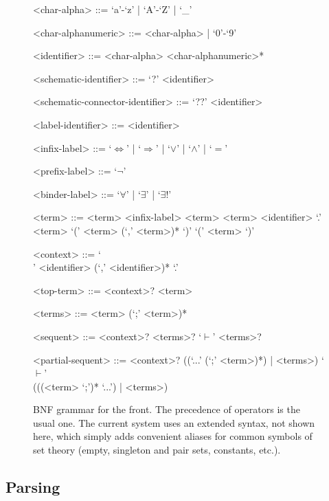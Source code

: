 \begin{figure}[H]
  \centering
  \begin{framed}
  \begin{grammar}
  <char-alpha> ::= `a'-`z' | `A'-`Z' | `_'
  
  <char-alphanumeric> ::= <char-alpha> | `0'-`9'
  
  <identifier> ::= <char-alpha> <char-alphanumeric>*
  
  <schematic-identifier> ::= `?' <identifier>
  
  <schematic-connector-identifier> ::= `??' <identifier>
  
  <label-identifier> ::= <identifier>
  
  <infix-label> ::= `\(\Leftrightarrow\)' | `\(\Rightarrow\)' | `\(\lor\)' | `\(\land\)' | `\(=\)'
  
  <prefix-label> ::= `\(\neg\)'
  
  <binder-label> ::= `\(\forall\)' | `\(\exists\)' | `\(\exists!\)'
  
  <term> ::= <term> <infix-label> <term>
   <term>
   <identifier> `.' <term>
   `(' <term> (`,' <term>)* `)'
  \alt `(' <term> `)'
  
  <context> ::= `\\' <identifier> (`,' <identifier>)* `.'
  
  <top-term> ::= <context>? <term>
  
  <terms> ::= <term> (`;' <term>)*
  
  <sequent> ::= <context>? <terms>? `\(\vdash\)' <terms>?
  
  <partial-sequent> ::= <context>? ((`...' (`;' <term>)*) | <terms>) `\(\vdash\)' \\
  (((<term> `;')* `...') | <terms>)
  \end{grammar}
  \end{framed}
  \caption[BNF grammar]{BNF grammar for the front. The precedence of operators is the usual one. The current system uses an extended syntax, not shown here, which simply adds convenient aliases for common symbols of set theory (empty, singleton and pair sets, constants, etc.).}
  \label{fig:grammar}
\end{figure}

\subsection{Parsing}

